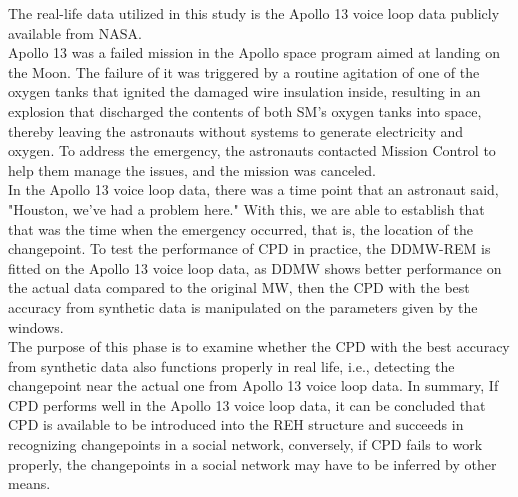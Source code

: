 \documentclass[]{interact}
\theoremstyle{plain}%
\theoremstyle{definition}
\theoremstyle{remark}
\begin{document}
The real-life data utilized in this study is the Apollo 13 voice loop data publicly available from NASA.\\

Apollo 13 was a failed mission in the Apollo space program aimed at landing on the Moon. The failure of it was triggered by a routine agitation of one of the oxygen tanks that ignited the damaged wire insulation inside, resulting in an explosion that discharged the contents of both SM's oxygen tanks into space, thereby leaving the astronauts without systems to generate electricity and oxygen. To address the emergency, the astronauts contacted Mission Control to help them manage the issues, and the mission was canceled. \\

In the Apollo 13 voice loop data, there was a time point that an astronaut said, "Houston, we've had a problem here." With this, we are able to establish that that was the time when the emergency occurred, that is, the location of the changepoint. To test the performance of CPD in practice, the DDMW-REM is fitted on the Apollo 13 voice loop data, as DDMW shows better performance on the actual data compared to the original MW, then the CPD with the best accuracy from synthetic data is manipulated on the parameters given by the windows.\\

The purpose of this phase is to examine whether the CPD with the best accuracy from synthetic data also functions properly in real life, i.e., detecting the changepoint near the actual one from Apollo 13 voice loop data. In summary, If CPD performs well in the Apollo 13 voice loop data, it can be concluded that CPD is available to be introduced into the REH structure and succeeds in recognizing changepoints in a social network, conversely, if CPD fails to work properly, the changepoints in a social network may have to be inferred by other means. \\

\newpage

\nocite{*} %


\end{document}
